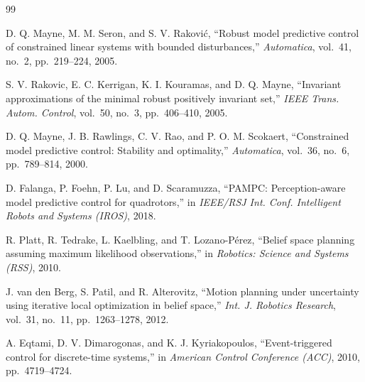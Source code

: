 \documentclass[letterpaper, 10 pt, conference]{ieeeconf}  %
\begin{document}

\begin{thebibliography}{99}

 D. Q. Mayne, M. M. Seron, and S. V. Rakovi\'c,
``Robust model predictive control of constrained linear systems with bounded
disturbances,'' \emph{Automatica}, vol.~41, no.~2, pp.~219--224, 2005.

 S. V. Rakovic, E. C. Kerrigan, K. I. Kouramas, and D. Q. Mayne,
``Invariant approximations of the minimal robust positively invariant set,''
\emph{IEEE Trans. Autom. Control}, vol.~50, no.~3, pp.~406--410, 2005.

 D. Q. Mayne, J. B. Rawlings, C. V. Rao, and
P. O. M. Scokaert, ``Constrained model predictive control: Stability and
optimality,'' \emph{Automatica}, vol.~36, no.~6, pp.~789--814, 2000.

 D. Falanga, P. Foehn, P. Lu, and D. Scaramuzza,
``PAMPC: Perception-aware model predictive control for quadrotors,'' in
\emph{IEEE/RSJ Int. Conf. Intelligent Robots and Systems (IROS)}, 2018.

 R. Platt, R. Tedrake, L. Kaelbling, and
T. Lozano-P\'erez, ``Belief space planning assuming maximum likelihood
observations,'' in \emph{Robotics: Science and Systems (RSS)}, 2010.

 J. van den Berg, S. Patil, and R. Alterovitz,
``Motion planning under uncertainty using iterative local optimization in belief
space,'' \emph{Int. J. Robotics Research}, vol.~31, no.~11, pp.~1263--1278, 2012.

 A. Eqtami, D. V. Dimarogonas, and K. J. Kyriakopoulos,
``Event-triggered control for discrete-time systems,'' in \emph{American Control
Conference (ACC)}, 2010, pp.~4719--4724.

\end{thebibliography}
\end{document}

